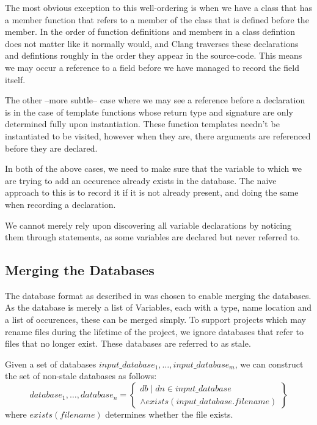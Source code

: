 The most obvious exception to this well-ordering is when we have a class that
has a member function that refers to a member of the class that is defined
before the member. In \CC{} the order of function definitions and members in a
class defintion does not matter like it normally would, and Clang traverses
these declarations and defintions roughly in the order they appear in the
source-code. This means we may occur a reference to a field before we have
managed to record the field itself.

The other --more subtle-- case where we may see a reference before a declaration
is in the case of template functions whose return type and signature are only
determined fully upon instantiation. These function templates needn't be
instantiated to be visited, however when they are, there arguments are
referenced before they are declared.

In both of the above cases, we need to make sure that the variable to which we
are trying to add an occurence already exists in the database. The naive
approach to this is to record it if it is not already present, and doing the
same when recording a declaration.

We cannot merely rely upon discovering all variable declarations by noticing
them through statements, as some variables are declared but never referred to.

\subsection{Merging the Databases}
\label{sec:dbmerge}

The database format as described in  was chosen to enable
merging the databases.
As the database is merely a list of Variables, each with a type, name location
and a list of occurences, these can be merged simply.
To support projects which may rename files during the lifetime of the project,
we ignore databases that refer to files that no longer exist. These databases
are referred to as stale.

Given a set of databases $input\_database_1, \ldots, input\_database_m$, we can
construct the set of non-stale databases as follows:
\begin{equation}
	database_1, \ldots, database_n = \left \{
		\substack {
			db \mid dn \in input\_database \\
			\land exists(input\_database.filename)
		}
	\right \}
\end{equation}
where $exists(filename)$ determines whether the file exists.

